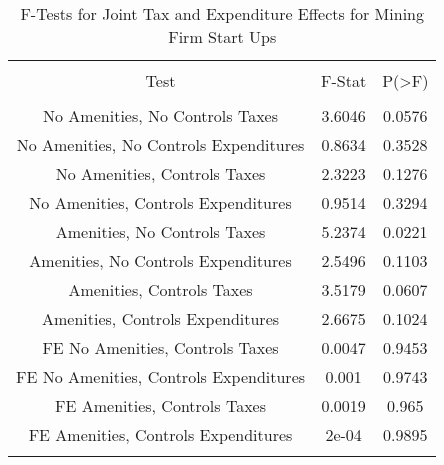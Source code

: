
\begin{table}[!htbp] \centering 
  \caption{F-Tests for Joint Tax and Expenditure Effects for Mining Firm Start Ups} 
  \label{21Ftests} 
\begin{tabular}{@{\extracolsep{5pt}} ccc} 
\\[-1.8ex]\hline 
\hline \\[-1.8ex] 
Test & F-Stat & P(\textgreater F) \\ 
\hline \\[-1.8ex] 
No Amenities, No Controls Taxes & 3.6046 & 0.0576 \\ 
No Amenities, No Controls Expenditures & 0.8634 & 0.3528 \\ 
No Amenities, Controls Taxes & 2.3223 & 0.1276 \\ 
No Amenities, Controls Expenditures & 0.9514 & 0.3294 \\ 
Amenities, No Controls Taxes & 5.2374 & 0.0221 \\ 
Amenities, No Controls Expenditures & 2.5496 & 0.1103 \\ 
Amenities, Controls Taxes & 3.5179 & 0.0607 \\ 
Amenities, Controls Expenditures & 2.6675 & 0.1024 \\ 
FE No Amenities, Controls Taxes & 0.0047 & 0.9453 \\ 
FE No Amenities, Controls Expenditures & 0.001 & 0.9743 \\ 
FE Amenities, Controls Taxes & 0.0019 & 0.965 \\ 
FE Amenities, Controls Expenditures & 2e-04 & 0.9895 \\ 
\hline \\[-1.8ex] 
\end{tabular} 
\end{table} 
